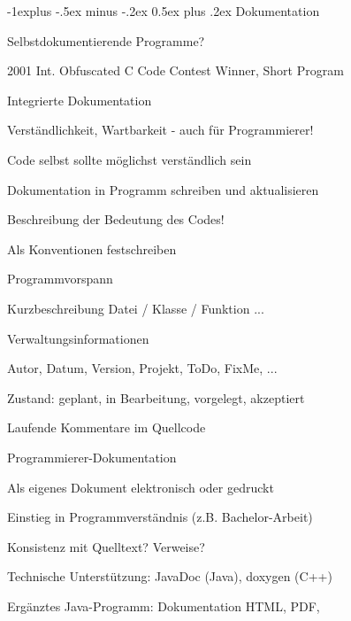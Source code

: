 \documentclass[a4paper]{article}
\makeatletter
\renewcommand{\subsection}{\@startsection{subsection}{2}{0mm}%
                                {-1explus -.5ex minus -.2ex}%
                                {0.5ex plus .2ex}%
                                {\normalfont\normalsize\bfseries}}
\makeatother
\begin{document}
\begin{multicols}{3}
  \subsection{Dokumentation}
  \begin{itemize*}
    \item Selbstdokumentierende Programme?
          \begin{itemize*}
            \item 2001 Int. Obfuscated C Code Contest Winner, Short Program
          \end{itemize*}
  \end{itemize*}

  Integrierte Dokumentation
  \begin{itemize*}
    \item Verständlichkeit, Wartbarkeit - auch für Programmierer!
    \item Code selbst sollte möglichst verständlich sein
    \item Dokumentation in Programm schreiben und aktualisieren
    \item Beschreibung der Bedeutung des Codes!
    \item Als Konventionen festschreiben
    \item Programmvorspann
    \item Kurzbeschreibung Datei / Klasse / Funktion ...
    \item Verwaltungsinformationen
          \begin{itemize*}
            \item Autor, Datum, Version, Projekt, ToDo, FixMe, ...
            \item Zustand: geplant, in Bearbeitung, vorgelegt, akzeptiert
          \end{itemize*}
    \item Laufende Kommentare im Quellcode
  \end{itemize*}

  Programmierer-Dokumentation
  \begin{itemize*}
    \item Als eigenes Dokument elektronisch oder gedruckt
    \item Einstieg in Programmverständnis (z.B. Bachelor-Arbeit)
    \item Konsistenz mit Quelltext? Verweise?
    \item Technische Unterstützung: JavaDoc (Java), doxygen (C++)
    \item Ergänztes Java-Programm: Dokumentation HTML, PDF,
  \end{itemize*}


\end{multicols}
\end{document}
